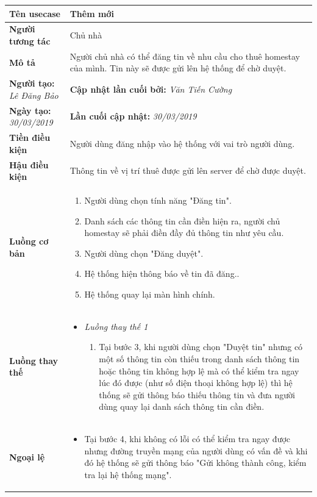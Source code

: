 \begin{center}
	\begin{longtable}{ | l |p{10cm}|}
		\hline
		\textbf{Tên usecase} & Thêm mới \\ \hline
		\textbf{Người tương tác} & Chủ nhà \\ \hline   
		\textbf{Mô tả} &  Người chủ nhà có thể đăng tin về nhu cầu cho thuê homestay của mình. Tin này sẽ được gửi lên hệ thống để chờ duyệt.\\ \hline  
		\textbf{Người tạo:} \textit{Lê Đăng Bảo} & \textbf{Cập nhật lần cuối bởi:} \textit{Văn Tiến Cường} \\ \hline
		\textbf{Ngày tạo:} \textit{30/03/2019} & \textbf{Lần cuối cập nhật:} \textit{30/03/2019} \\ \hline
		\textbf{Tiền điều kiện} &  Người dùng đăng nhập vào hệ thống với vai trò người dùng. \\ \hline 
		\textbf{Hậu điều kiện} &  Thông tin về vị trí thuê được gửi lên server để chờ được duyệt. \\ \hline 
		\textbf{Luồng cơ bản} & 
		\begin{enumerate}
			\item Người dùng chọn tính năng "Đăng tin".
			\item Danh sách các thông tin cần điền hiện ra, người chủ homestay sẽ phải điền đầy đủ thông tin như yêu cầu.
			\item Người dùng chọn "Đăng duyệt".
			\item Hệ thống hiện thông báo về tin đã đăng..
			\item Hệ thống quay lại màn hình chính.
		\end{enumerate} \\ \hline 
		\textbf{Luồng thay thế} & 
		\begin{itemize} 
			\item \textit{Luồng thay thế 1}
			\begin{enumerate}
				\item Tại bước 3, khi người dùng chọn "Duyệt tin" nhưng có một số thông tin còn thiếu trong danh sách thông tin hoặc thông tin không hợp lệ mà có thể kiểm tra ngay lúc đó được (như số điện thoại không hợp lệ) thì hệ thống sẽ gửi thông báo thiếu thông tin và đưa người dùng quay lại danh sách thông tin cần điền.
			\end{enumerate}
		\end{itemize} \\ \hline 
		
		\textbf{Ngoại lệ} &
		\begin{itemize}
		    \item Tại bước 4, khi không có lỗi có thể kiểm tra ngay được nhưng đường truyền mạng của người dùng có vấn đề và khi đó hệ thống sẽ gửi thông báo "Gửi không thành công, kiểm tra lại hệ thống mạng".
		\end{itemize} \\ \hline
	\end{longtable}
\end{center}


